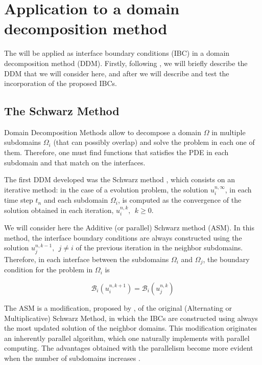 \section{Application to a domain decomposition method}
\label{sec:DDM}

\indent The   will be applied as interface boundary conditions (IBC) in a domain decomposition method (DDM). Firstly, following \cite{Japhet2003}, we will briefly describe the DDM that we will consider here, and after we will describe and test the incorporation of the proposed IBCs.

\subsection{The Schwarz Method}

\indent Domain Decomposition Methods allow to decompose a domain $\Omega$ in multiple subdomains $\Omega_i$ (that can possibly overlap) and solve the problem in each one of them. Therefore, one must find functions that satisfies the PDE in each subdomain and that match on the interfaces. 

\indent The first DDM developed was the Schwarz method \cite{Japhet2003,Gander2008}, which consists on an iterative method: in the case of a evolution problem, the solution  $u_i^{n,\infty}$, in each time step $t_n$ and each subdomain $\Omega_i$, is computed as the convergence of the solution obtained in each iteration, $u_i^{n,k}, \ \ k\geq 0$.

\indent We will consider here the Additive (or parallel) Schwarz method (ASM). In this method, the interface boundary conditions are always constructed using the solution $u_j^{n,k-1}, \ \ j \neq i$ of the previous iteration in the neighbor subdomains. Therefore, in each interface between the subdomains $\Omega_i$ and $\Omega_j$, the boundary condition for the problem in $\Omega_i$ is

\begin{equation}
	\label{eq:genericIBC}
\mathcal{B}_i(u_i^{n,k+1}) = \mathcal{B}_i(u_j^{n,k})
\end{equation}

\indent The ASM is a modification, proposed by \cite{Lions1988}, of the original (Alternating or Multiplicative) Schwarz Method, in which the IBCs are constructed using always the most updated solution of the neighbor domains. This modification originates an inherently parallel algorithm, which one naturally implements with parallel computing. The advantages obtained with the parallelism become more evident when the number of subdomains increases \cite{Lions1988}.

